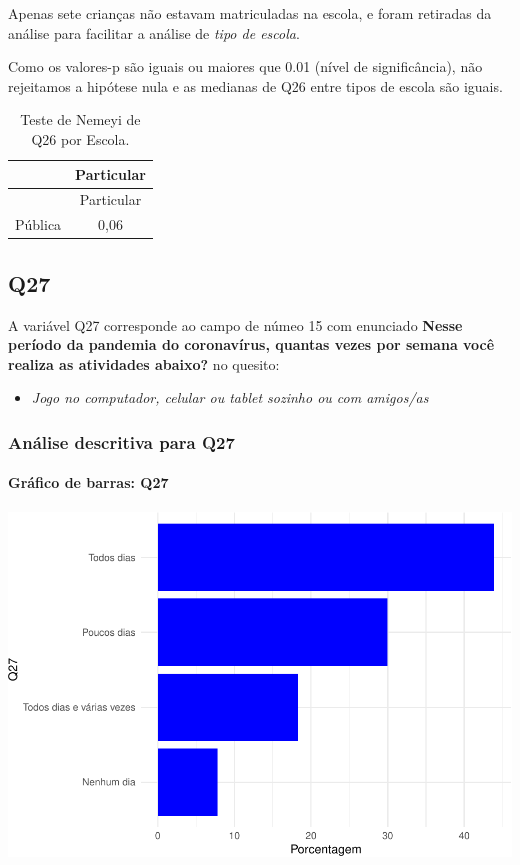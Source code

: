 \documentclass[]{article}
\providecommand{\tightlist}{%
  \setlength{\itemsep}{0pt}\setlength{\parskip}{0pt}}
\let\oldparagraph\paragraph
\renewcommand{\paragraph}[1]{\oldparagraph{#1}\mbox{}}
\begin{document}
Apenas sete crianças não estavam matriculadas na escola, e foram retiradas da análise para facilitar a análise de \emph{tipo de escola}.

Como os valores-p são iguais ou maiores que 0.01 (nível de significância), não rejeitamos a hipótese nula e as medianas de Q26 entre tipos de escola são iguais.

\begin{longtable}[]{@{}lc@{}}
\caption{\label{tab:unnamed-chunk-770}Teste de Nemeyi de Q26 por Escola.}\tabularnewline
\toprule
& Particular\tabularnewline
\midrule
\endfirsthead
\toprule
& Particular\tabularnewline
\midrule
\endhead
Pública & 0,06\tabularnewline
\bottomrule
\end{longtable}

\cleardoublepage

\hypertarget{q27}{%
\subsection{Q27}\label{q27}}

A variável Q27 corresponde ao campo de númeo 15 com enunciado \textbf{Nesse período da pandemia do coronavírus, quantas vezes por semana você realiza as atividades abaixo?} no quesito:

\begin{itemize}
\tightlist
\item
  \emph{Jogo no computador, celular ou tablet sozinho ou com amigos/as}
\end{itemize}

\hypertarget{anuxe1lise-descritiva-para-q27}{%
\subsubsection{Análise descritiva para Q27}\label{anuxe1lise-descritiva-para-q27}}

\hypertarget{gruxe1fico-de-barras-q27}{%
\paragraph{Gráfico de barras: Q27}\label{gruxe1fico-de-barras-q27}}

\begin{center}\includegraphics[width=0.75\linewidth]{relatorio_covid19_files/figure-latex/unnamed-chunk-777-1} \end{center}
\end{document}
